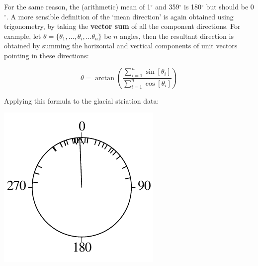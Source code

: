For the same reason, the (arithmetic) mean of 1$^\circ$ and
359$^\circ$ is 180$^\circ$ but should be 0$^\circ$. A more sensible
definition of the `mean direction' is again obtained using
trigonometry, by taking the \textbf{vector sum} of all the component
directions. For example, let $\theta = \{\theta_1, \ldots, \theta_i,
\ldots \theta_n \}$ be $n$ angles, then the resultant direction is
obtained by summing the horizontal and vertical components of unit
vectors pointing in these directions:

\begin{equation}
  \overline{\theta} = \arctan\left(\frac{\sum_{i=1}^{n}
    \sin[\theta_i]}{\sum_{i=1}^{n}\cos[\theta_i]} \right)
  \label{eq:averagedirection}
\end{equation}

Applying this formula to the glacial striation data:

\noindent\begin{minipage}[t][][b]{.2\textwidth}
\includegraphics[width=\textwidth]{../figures/circle3.pdf}\\
\end{minipage}
\begin{minipage}[t][][t]{.8\textwidth}
  \label{fig:circle3}
\end{minipage}


